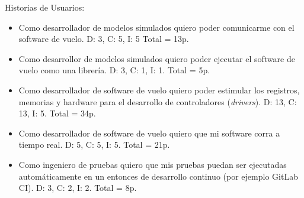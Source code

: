 Historias de Usuarios:

\begin{itemize}
\item Como desarrollador de modelos simulados quiero poder comunicarme con el software de vuelo. D: 3, C: 5, I: 5 Total = 13p.

\item Como desarrollor de modelos simulados quiero poder ejecutar el software de vuelo como una librería. D: 3, C: 1, I: 1. Total = 5p.

\item Como desarrollador de software de vuelo quiero poder estimular los registros, memorias y hardware para el desarrollo de controladores (\textit{drivers}). D: 13, C: 13, I: 5. Total = 34p.

\item Como desarrollador de software de vuelo quiero que mi software corra a tiempo real. D: 5, C: 5, I: 5. Total = 21p.

\item Como ingeniero de pruebas quiero que mis pruebas puedan ser ejecutadas automáticamente en un entonces de desarrollo continuo (por ejemplo GitLab CI). D: 3, C: 2, I: 2. Total = 8p.
\end{itemize}
